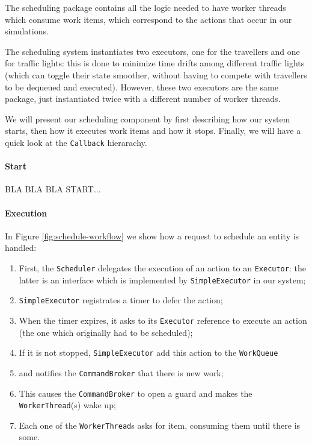 The scheduling package contains all the logic needed to have worker threads
which consume work items, which correspond to the actions that occur in our
simulations.

The scheduling system instantiates two executors, one for the travellers and
one for traffic lights: this is done to minimize time drifts among different
traffic lights (which can toggle their state smoother, without having to
compete with travellers to be dequeued and executed).
However, these two executors are the same package, just instantiated twice with
a different number of worker threads.

We will present our scheduling component by first describing how our system
starts, then how it executes work items and how it stops.
Finally, we will have a quick look at the \texttt{Callback} hierarachy.

\paragraph{Start}

BLA BLA BLA START...

\paragraph{Execution}

In Figure \ref{fig:schedule-workflow} we show how a request to schedule an
entity is handled:

\begin{enumerate}
  \item First, the \texttt{Scheduler} delegates the execution of an action to an
    \texttt{Executor}: the latter is an interface which is implemented by
    \texttt{SimpleExecutor} in our system;
  \item \texttt{SimpleExecutor} registrates a timer to defer the action;
  \item When the timer expires, it asks to its \texttt{Executor} reference to
    execute an action (the one which originally had to be scheduled);
  \item If it is not stopped, \texttt{SimpleExecutor} add this action to the
    \texttt{WorkQueue}
  \item and notifies the \texttt{CommandBroker} that there is new work;
  \item This causes the \texttt{CommandBroker} to open a guard and makes the
    \texttt{WorkerThread}(s) wake up;
  \item Each one of the \texttt{WorkerThread}s asks for item, consuming them
    until there is some.
\end{enumerate}

